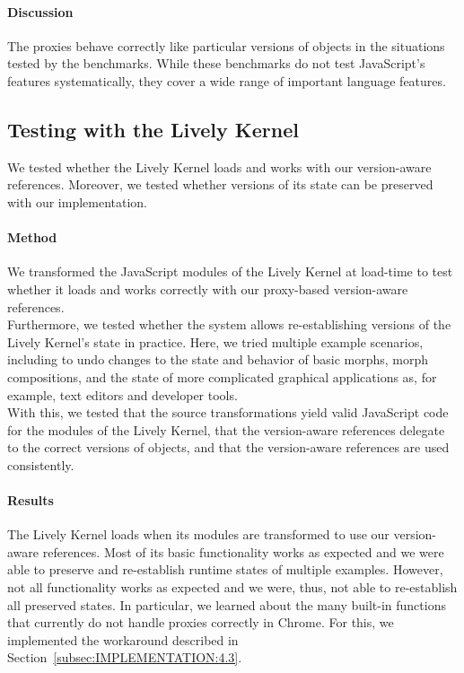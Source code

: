 \paragraph{Discussion}
The proxies behave correctly like particular versions of objects in the situations tested by the benchmarks.
While these benchmarks do not test JavaScript's features systematically, they cover a wide range of important language features.


\subsection{Testing with the Lively Kernel}

We tested whether the Lively Kernel loads and works with our version-aware references.
Moreover, we tested whether versions of its state can be preserved with our implementation.

\paragraph{Method}
We transformed the JavaScript modules of the Lively Kernel at load-time to test whether it loads and works correctly with our proxy-based version-aware references.\\
Furthermore, we tested whether the system allows re-establishing versions of the Lively Kernel's state in practice.
Here, we tried multiple example scenarios, including to undo changes to the state and behavior of basic morphs, morph compositions, and the state of more complicated graphical applications as, for example, text editors and developer tools.\\
With this, we tested that the source transformations yield valid JavaScript code for the modules of the Lively Kernel, that the version-aware references delegate to the correct versions of objects, and that the version-aware references are used consistently.


\paragraph{Results}
The Lively Kernel loads when its modules are transformed to use our version-aware references.
Most of its basic functionality works as expected and we were able to preserve and re-establish runtime states of multiple examples.
However, not all functionality works as expected and we were, thus, not able to re-establish all preserved states.
In particular, we learned about the many built-in functions that currently do not handle proxies correctly in Chrome.
For this, we implemented the workaround described in Section~\ref{subsec:IMPLEMENTATION:4.3}.

